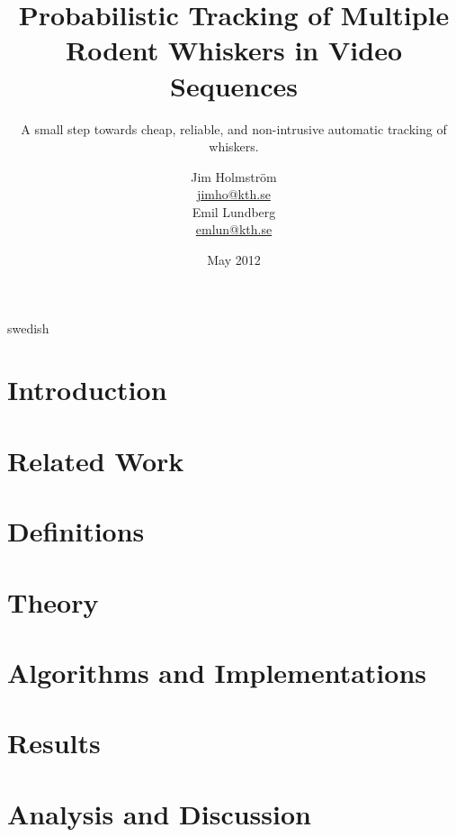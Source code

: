 \documentclass[a4paper,11pt]{kth-mag}
\title{
    Probabilistic Tracking of Multiple Rodent Whiskers in Video
    Sequences
}
\subtitle{
    A small step towards cheap, reliable, and non-intrusive automatic tracking of whiskers.
}
\author{
    Jim Holmström\\
    \href{mailto:jimho@kth.se}{jimho@kth.se}\\
    Emil Lundberg\\
    \href{mailto:emlun@kth.se}{emlun@kth.se}
}
\date{May 2012}
\theoremstyle{definition}
\begin{document}
\frontmatter
\pagestyle{empty}
\removepagenumbers
\maketitle
{}
\begin{abstract}
    
\end{abstract}
\clearpage
\begin{foreignabstract}{swedish}
    
\end{foreignabstract}
\clearpage
\tableofcontents*
\mainmatter
\pagestyle{newchap}
\chapter{Introduction}
    \label{sec:introduction}
    

\chapter{Related Work}
    \label{sec:related_work}
    

\chapter{Definitions}
    \label{sec:definitions}
    

\chapter{Theory}
    \label{sec:theory}
    

\chapter{Algorithms and Implementations}
    \label{sec:algorithms_implementations}
    


\chapter{Results}
    \label{sec:benchmarks_results}
    

\chapter{Analysis and Discussion}
    \label{sec:analysis_discussion}
    
    \label{sec:future}
    
\end{document}
